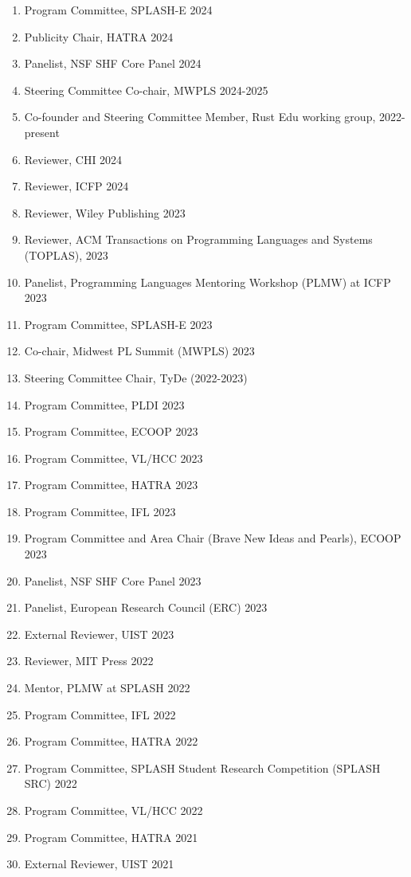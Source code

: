 \documentclass[10pt,letterpaper]{article}
\begin{document}
\begin{enumerate}
  \item Program Committee, SPLASH-E 2024
  \item Publicity Chair, HATRA 2024
  \item Panelist, NSF SHF Core Panel 2024
  \item Steering Committee Co-chair, MWPLS 2024-2025
  \item Co-founder and Steering Committee Member, Rust Edu working group, 2022-present
  \item Reviewer, CHI 2024
  \item Reviewer, ICFP 2024
  \item Reviewer, Wiley Publishing 2023
  \item Reviewer, ACM Transactions on Programming Languages and Systems (TOPLAS), 2023
  \item Panelist, Programming Languages Mentoring Workshop (PLMW) at ICFP 2023
  \item Program Committee, SPLASH-E 2023
  \item Co-chair, Midwest PL Summit (MWPLS) 2023
  \item Steering Committee Chair, TyDe (2022-2023)
  \item Program Committee, PLDI 2023
  \item Program Committee, ECOOP 2023
  \item Program Committee, VL/HCC 2023
  \item Program Committee, HATRA 2023
  \item Program Committee, IFL 2023
  \item Program Committee and Area Chair (Brave New Ideas and Pearls), ECOOP 2023
  \item Panelist, NSF SHF Core Panel 2023
  \item Panelist, European Research Council (ERC) 2023
  \item External Reviewer, UIST 2023
  \item Reviewer, MIT Press 2022
  \item Mentor, PLMW at SPLASH 2022
  \item Program Committee, IFL 2022
  \item Program Committee, HATRA 2022
  \item Program Committee, SPLASH Student Research Competition (SPLASH SRC) 2022
  \item Program Committee, VL/HCC 2022
  \item Program Committee, HATRA 2021
  \item External Reviewer, UIST 2021

\end{enumerate}
\end{document}
